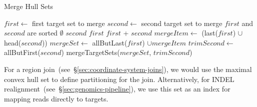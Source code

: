 \documentclass{acm_proc_article-sp}
\begin{document}
\begin{algorithm}
\caption{Merge Hull Sets}
\label{alg:join-targets}
\begin{algorithmic}
\STATE $first \leftarrow$ first target set to merge
\STATE $second \leftarrow$ second target set to merge
\REQUIRE $first$ and $second$ are sorted
\RETURN $\emptyset$
\RETURN $second$
\RETURN $first$
\ELSE
{}
\RETURN $first$ + $second$
\ELSE
\STATE $mergeItem \leftarrow$ (last($first$) $\cup$ head($second$))
\STATE $mergeSet \leftarrow$ allButLast($first$) $\cup mergeItem$
\STATE $trimSecond \leftarrow$ allButFirst($second$)
\RETURN mergeTargetSets($mergeSet$, $trimSecond$)
\ENDIF
\ENDIF
\end{algorithmic}
\end{algorithm}

For a region join~(see~\S\ref{sec:coordinate-system-joins}), we would use the maximal convex hull
set to define partitioning for the join. Alternatively, for INDEL
realignment~(see~\S\ref{sec:genomics-pipeline}), we use this set as an index for mapping reads directly
to targets.

\balance
\end{document}
